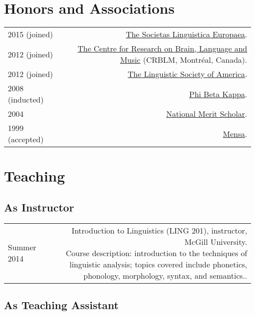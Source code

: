 \documentclass[11pt,letterpaper]{article}
\makeatletter
\newcommand{\bodywidth}{0.81}
\newcommand{\myvrule}{\color{lightgray}\vrule width 1.0pt}
\newenvironment{cvsection}{%
  \renewcommand{\arraystretch}{1.60}
  \begin{longtable}[l]{@{} L R @{}}
}{%
  \end{longtable}
}
\newcommand{\course}[2]{%
  \parbox[t]{\bodywidth\textwidth}{#1. \\ {\footnotesize Course description:
      #2.}}
}
\makeatother
\begin{document}
\section*{Honors and Associations}

\begin{cvsection}
  2015 {\footnotesize (joined)} & \href{http://www.societaslinguistica.eu/}{The
    Societas Linguistica Europaea}. \\

  2012 {\footnotesize (joined)} & \href{http://www.crblm.ca/}{The Centre for
    Research on Brain, Language and Music} (CRBLM, Montr\'{e}al, Canada). \\

  2012 {\footnotesize (joined)} &
  \href{http://www.linguisticsociety.org/}{The Linguistic Society of America}. \\

  2008 {\footnotesize (inducted)} & \href{http://www.pbk.org/}{Phi Beta Kappa}. \\

  2004 & \href{http://www.nationalmerit.org/}{National Merit Scholar}. \\

  1999 {\footnotesize (accepted)} & \href{http://www.mensa.org/}{Mensa}. \\
\end{cvsection}

\section*{Teaching}

\subsection*{As Instructor}

\begin{cvsection}
  {\small Summer} 2014 & \course{Introduction to Linguistics (LING 201),
    instructor, McGill University}{introduction to the techniques of linguistic
    analysis; topics covered include phonetics, phonology, morphology, syntax,
    and semantics.}
  \\[0.10ex]
\end{cvsection}

\vspace{-1ex}
\subsection*{As Teaching Assistant}
\end{document}
